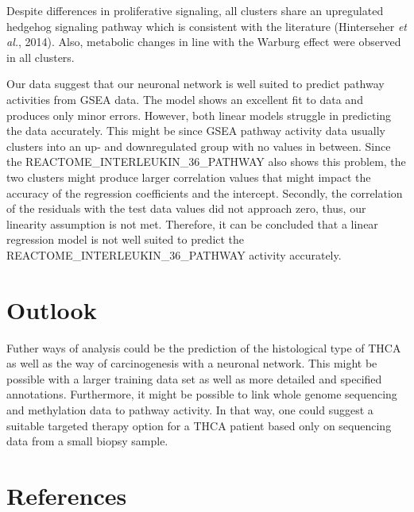 \documentclass[
  parskip,
  oneside]{scrreprt}
\begin{document}
Despite differences in proliferative signaling, all clusters share an
upregulated hedgehog signaling pathway which is consistent with the
literature (Hinterseher \emph{et al.}, 2014). Also, metabolic changes in
line with the Warburg effect were observed in all clusters.

Our data suggest that our neuronal network is well suited to predict
pathway activities from GSEA data. The model shows an excellent fit to
data and produces only minor errors. However, both linear models
struggle in predicting the data accurately. This might be since GSEA
pathway activity data usually clusters into an up- and downregulated
group with no values in between. Since the
REACTOME\_INTERLEUKIN\_36\_PATHWAY also shows this problem, the two
clusters might produce larger correlation values that might impact the
accuracy of the regression coefficients and the intercept. Secondly, the
correlation of the residuals with the test data values did not approach
zero, thus, our linearity assumption is not met. Therefore, it can be
concluded that a linear regression model is not well suited to predict
the REACTOME\_INTERLEUKIN\_36\_PATHWAY activity accurately.

\hypertarget{outlook}{%
\chapter{Outlook}\label{outlook}}

Futher ways of analysis could be the prediction of the histological type
of THCA as well as the way of carcinogenesis with a neuronal network.
This might be possible with a larger training data set as well as more
detailed and specified annotations. Furthermore, it might be possible to
link whole genome sequencing and methylation data to pathway activity.
In that way, one could suggest a suitable targeted therapy option for a
THCA patient based only on sequencing data from a small biopsy sample.

\hypertarget{references}{%
\chapter{References}\label{references}}
\end{document}
